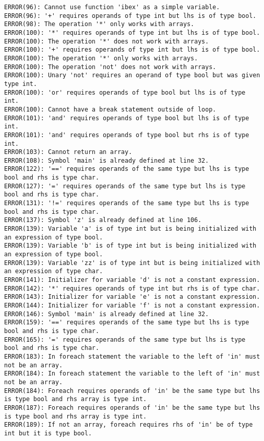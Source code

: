 \documentclass[12pt]{book}
\begin{document}
\begin{lstlisting}
ERROR(96): Cannot use function 'ibex' as a simple variable.
ERROR(96): '+' requires operands of type int but lhs is of type bool.
ERROR(98): The operation '*' only works with arrays.
ERROR(100): '*' requires operands of type int but lhs is of type bool.
ERROR(100): The operation '*' does not work with arrays.
ERROR(100): '+' requires operands of type int but lhs is of type bool.
ERROR(100): The operation '*' only works with arrays.
ERROR(100): The operation 'not' does not work with arrays.
ERROR(100): Unary 'not' requires an operand of type bool but was given type int.
ERROR(100): 'or' requires operands of type bool but lhs is of type int.
ERROR(100): Cannot have a break statement outside of loop.
ERROR(101): 'and' requires operands of type bool but lhs is of type int.
ERROR(101): 'and' requires operands of type bool but rhs is of type int.
ERROR(103): Cannot return an array.
ERROR(108): Symbol 'main' is already defined at line 32.
ERROR(122): '==' requires operands of the same type but lhs is type bool and rhs is type char.
ERROR(127): '=' requires operands of the same type but lhs is type bool and rhs is type char.
ERROR(131): '!=' requires operands of the same type but lhs is type bool and rhs is type char.
ERROR(137): Symbol 'z' is already defined at line 106.
ERROR(139): Variable 'a' is of type int but is being initialized with an expression of type bool.
ERROR(139): Variable 'b' is of type int but is being initialized with an expression of type bool.
ERROR(139): Variable 'zz' is of type int but is being initialized with an expression of type char.
ERROR(141): Initializer for variable 'd' is not a constant expression.
ERROR(142): '*' requires operands of type int but rhs is of type char.
ERROR(143): Initializer for variable 'e' is not a constant expression.
ERROR(144): Initializer for variable 'f' is not a constant expression.
ERROR(146): Symbol 'main' is already defined at line 32.
ERROR(159): '==' requires operands of the same type but lhs is type bool and rhs is type char.
ERROR(165): '=' requires operands of the same type but lhs is type bool and rhs is type char.
ERROR(183): In foreach statement the variable to the left of 'in' must not be an array.
ERROR(184): In foreach statement the variable to the left of 'in' must not be an array.
ERROR(184): Foreach requires operands of 'in' be the same type but lhs is type bool and rhs array is type int.
ERROR(187): Foreach requires operands of 'in' be the same type but lhs is type bool and rhs array is type int.
ERROR(189): If not an array, foreach requires rhs of 'in' be of type int but it is type bool.

\end{lstlisting}
\end{document}
